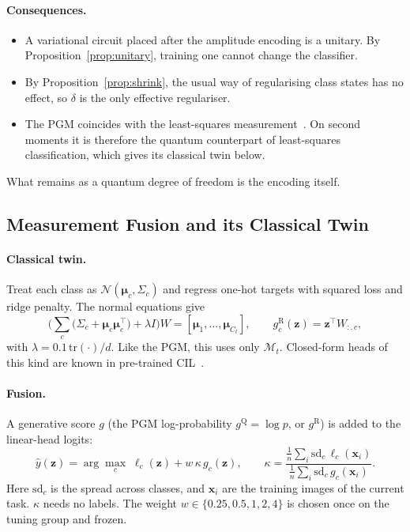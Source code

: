 \paragraph{Consequences.}
\begin{itemize}
  \item A variational circuit placed after the amplitude encoding is a
    unitary. By Proposition~\ref{prop:unitary}, training one cannot change
    the classifier.
  \item By Proposition~\ref{prop:shrink}, the usual way of regularising
    class states has no effect, so $\delta$ is the only effective
    regulariser.
  \item The PGM coincides with the least-squares measurement~\cite{eldar2001srm}.
    On second moments it is therefore the quantum counterpart of
    least-squares classification, which gives its classical twin below.
\end{itemize}
What remains as a quantum degree of freedom is the encoding itself.

\subsection{Measurement Fusion and its Classical Twin}
\label{sec:fusion}

\paragraph{Classical twin.}
Treat each class as $\mathcal N(\boldsymbol\mu_c,\Sigma_c)$ and regress one-hot
targets with squared loss and ridge penalty. The normal equations give
\begin{equation}
  \Big(\sum_c\big(\Sigma_c+\boldsymbol\mu_c\boldsymbol\mu_c^{\top}\big)+\lambda I\Big)W=
  [\boldsymbol\mu_1,\dots,\boldsymbol\mu_{C_t}],\qquad g^{\mathrm R}_c(\mathbf z)=\mathbf z^{\top}W_{:,c},
  \label{eq:ridge}
\end{equation}
with $\lambda=0.1\,\mathrm{tr}(\cdot)/d$. Like the PGM, this uses only
$\mathcal M_t$. Closed-form heads of this kind are known in pre-trained
CIL~\cite{mcdonnell2023ranpac}.

\paragraph{Fusion.}
A generative score $g$ (the PGM log-probability $g^{\mathrm Q}=\log p$, or
$g^{\mathrm R}$) is added to the linear-head logits:
\begin{equation}
  \hat y(\mathbf z)=\arg\max_c\;\ell_c(\mathbf z)+w\,\kappa\,g_c(\mathbf z),\qquad
  \kappa=\frac{\frac1n\sum_i\mathrm{sd}_c\,\ell_c(\mathbf x_i)}{\frac1n\sum_i\mathrm{sd}_c\,g_c(\mathbf x_i)}.
  \label{eq:fusion}
\end{equation}
Here $\mathrm{sd}_c$ is the spread across classes, and $\mathbf x_i$ are the
training images of the current task. $\kappa$ needs no labels. The weight
$w\in\{0.25,0.5,1,2,4\}$ is chosen once on the tuning group and frozen.

